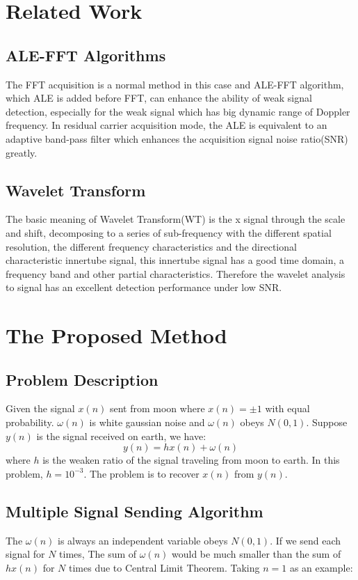 \documentclass[conference]{IEEEtran}
\begin{document}
\section{Related Work}
\subsection{ALE-FFT Algorithms\cite{b3}}
The FFT acquisition is a normal method in this case and ALE-FFT algorithm, which ALE is added before FFT, can enhance the ability of weak signal detection, especially for the weak signal which has big dynamic range of Doppler frequency. In residual carrier acquisition mode, the ALE is equivalent to an adaptive band-pass filter which enhances the acquisition signal noise ratio(SNR) greatly.

\subsection{Wavelet Transform\cite{b4}}
The basic meaning of Wavelet Transform(WT) is the x signal through the scale and shift, decomposing to a series of sub-frequency with the different spatial resolution, the different frequency characteristics and the directional characteristic innertube signal, this innertube signal has a good time domain, a frequency band and other partial characteristics. Therefore the wavelet analysis to signal has an excellent detection performance under low SNR.


\section{The Proposed Method}
\subsection{Problem Description}
Given the signal $x(n)$ sent from moon where $x(n)=\pm 1$ with equal probability. $\omega(n)$ is white gaussian noise and $\omega(n)$ obeys $N(0,1)$. Suppose $y(n)$ is the signal received on earth, we have:
\begin{equation*}
y(n) = hx(n) + \omega(n)
\end{equation*}
where $h$ is the weaken ratio of the signal traveling from moon to earth. In this problem, $h = 10^{-3}$. The problem is to recover $x(n)$ from $y(n)$.

\subsection{Multiple Signal Sending Algorithm}
The $\omega(n)$ is always an independent variable obeys $N(0,1)$. If we send each signal for $N$ times, The sum of $\omega(n)$ would be much smaller than the sum of $hx(n)$ for $N$ times due to Central Limit Theorem\cite{b5}. Taking $n=1$ as an example:
\end{document}
